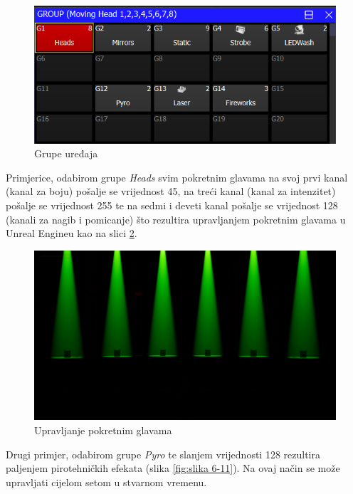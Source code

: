 \documentclass[times, utf8, zavrsni, numeric]{fer}
\begin{document}
\begin{figure}[htp]
	\centering
	\includegraphics[width=\linewidth]{slika 6-9.png}
	\caption{Grupe uređaja}
	\label{fig:slika 6-9}
\end{figure}

Primjerice, odabirom grupe \emph{Heads} svim pokretnim glavama na svoj prvi kanal (kanal za boju) pošalje se vrijednost 45, na treći kanal (kanal za intenzitet) pošalje se vrijednost 255 te na sedmi i deveti kanal pošalje se vrijednost 128 (kanali za nagib i pomicanje) što rezultira upravljanjem pokretnim glavama u Unreal Engineu kao na slici \ref{fig:slika 6-10}.

\begin{figure}[htp]
	\centering
	\includegraphics[width=\linewidth]{slika 6-10.png}
	\caption{Upravljanje pokretnim glavama}
	\label{fig:slika 6-10}
\end{figure}

Drugi primjer, odabirom grupe \emph{Pyro} te slanjem vrijednosti 128 rezultira paljenjem pirotehničkih efekata (slika \ref{fig:slika 6-11}). Na ovaj način se može upravljati cijelom setom u stvarnom vremenu.
\end{document}
